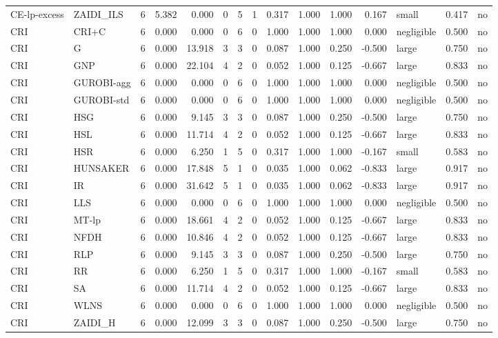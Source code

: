 \begin{table}[htbp]
\begin{tabular}{llrrrrrrrrrrlrr}
CE-lp-excess & ZAIDI\_ILS & 6 & 5.382 & 0.000 & 0 & 5 & 1 & 0.317 & 1.000 & 1.000 & 0.167 & small & 0.417 & no \\
CRI & CRI+C & 6 & 0.000 & 0.000 & 0 & 6 & 0 & 1.000 & 1.000 & 1.000 & 0.000 & negligible & 0.500 & no \\
CRI & G & 6 & 0.000 & 13.918 & 3 & 3 & 0 & 0.087 & 1.000 & 0.250 & -0.500 & large & 0.750 & no \\
CRI & GNP & 6 & 0.000 & 22.104 & 4 & 2 & 0 & 0.052 & 1.000 & 0.125 & -0.667 & large & 0.833 & no \\
CRI & GUROBI-agg & 6 & 0.000 & 0.000 & 0 & 6 & 0 & 1.000 & 1.000 & 1.000 & 0.000 & negligible & 0.500 & no \\
CRI & GUROBI-std & 6 & 0.000 & 0.000 & 0 & 6 & 0 & 1.000 & 1.000 & 1.000 & 0.000 & negligible & 0.500 & no \\
CRI & HSG & 6 & 0.000 & 9.145 & 3 & 3 & 0 & 0.087 & 1.000 & 0.250 & -0.500 & large & 0.750 & no \\
CRI & HSL & 6 & 0.000 & 11.714 & 4 & 2 & 0 & 0.052 & 1.000 & 0.125 & -0.667 & large & 0.833 & no \\
CRI & HSR & 6 & 0.000 & 6.250 & 1 & 5 & 0 & 0.317 & 1.000 & 1.000 & -0.167 & small & 0.583 & no \\
CRI & HUNSAKER & 6 & 0.000 & 17.848 & 5 & 1 & 0 & 0.035 & 1.000 & 0.062 & -0.833 & large & 0.917 & no \\
CRI & IR & 6 & 0.000 & 31.642 & 5 & 1 & 0 & 0.035 & 1.000 & 0.062 & -0.833 & large & 0.917 & no \\
CRI & LLS & 6 & 0.000 & 0.000 & 0 & 6 & 0 & 1.000 & 1.000 & 1.000 & 0.000 & negligible & 0.500 & no \\
CRI & MT-lp & 6 & 0.000 & 18.661 & 4 & 2 & 0 & 0.052 & 1.000 & 0.125 & -0.667 & large & 0.833 & no \\
CRI & NFDH & 6 & 0.000 & 10.846 & 4 & 2 & 0 & 0.052 & 1.000 & 0.125 & -0.667 & large & 0.833 & no \\
CRI & RLP & 6 & 0.000 & 9.145 & 3 & 3 & 0 & 0.087 & 1.000 & 0.250 & -0.500 & large & 0.750 & no \\
CRI & RR & 6 & 0.000 & 6.250 & 1 & 5 & 0 & 0.317 & 1.000 & 1.000 & -0.167 & small & 0.583 & no \\
CRI & SA & 6 & 0.000 & 11.714 & 4 & 2 & 0 & 0.052 & 1.000 & 0.125 & -0.667 & large & 0.833 & no \\
CRI & WLNS & 6 & 0.000 & 0.000 & 0 & 6 & 0 & 1.000 & 1.000 & 1.000 & 0.000 & negligible & 0.500 & no \\
CRI & ZAIDI\_H & 6 & 0.000 & 12.099 & 3 & 3 & 0 & 0.087 & 1.000 & 0.250 & -0.500 & large & 0.750 & no \\

\end{tabular}
\end{table}
